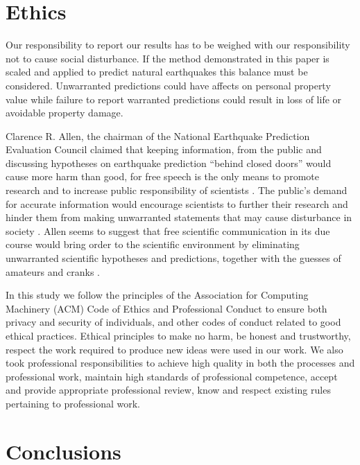 \documentclass[]{llncs} %
\begin{document}
\clearpage
\newpage

\section{Ethics}

Our responsibility to report our results has to be weighed with our responsibility not to cause social disturbance. If the method demonstrated in this paper is scaled and applied to predict natural earthquakes this balance must be considered. Unwarranted predictions could have affects on personal property value while failure to report warranted predictions could result in loss of life or avoidable property damage. \par

Clarence R. Allen, the chairman of the National Earthquake Prediction Evaluation Council claimed that keeping information, from the public and discussing hypotheses on earthquake prediction “behind closed doors” would cause more harm than good, for free speech is the only means to promote research and to increase public responsibility of scientists \cite{Ayhan}. The public’s demand for accurate information would encourage scientists to further their research and hinder them from making unwarranted statements that may cause disturbance in society \cite{Ayhan}. Allen seems to suggest that free scientific communication in its due course would bring order to the scientific environment by eliminating unwarranted scientific hypotheses and predictions, together with the guesses of amateurs and cranks \cite{Ayhan}. \par

In this study we follow the principles of the Association for Computing Machinery (ACM) Code of Ethics and Professional Conduct \cite{ACM} to ensure both privacy and security of individuals, and other codes of conduct related to good ethical practices. Ethical principles to make no harm, be honest and trustworthy, respect the work required to produce new ideas were used in our work. We also took professional responsibilities to achieve high quality in both the processes and professional work, maintain high standards of professional competence, accept and provide appropriate professional review, know and respect existing rules pertaining to professional work. \par

\section{Conclusions}
\end{document}
